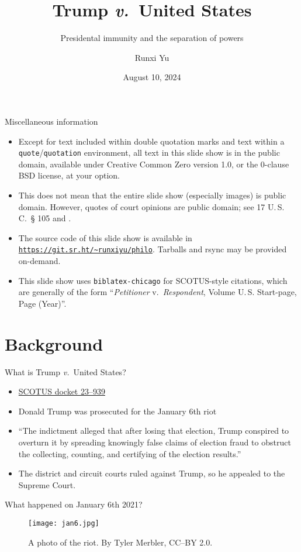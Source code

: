 \documentclass[ignorenonframetext, aspectratio=169]{beamer}
\title{Trump \textit{v.}\ United States}
\subtitle{Presidental immunity and the separation of powers}
\author{Runxi Yu}
\date{August 10, 2024}
\newcommand{\nopage}{\_\_\_\_}
\begin{document}
\begin{frame}
\titlepage
\end{frame}

\begin{frame}[fragile]{Miscellaneous information}
\begin{itemize}
	\item Except for text included within double quotation marks and text within a \verb|quote|/\verb|quotation| environment, all text in this slide show is in the public domain, available under Creative Common Zero version 1.0, or the 0-clause BSD license, at your option.
	\item This does not mean that the entire slide show (especially images) is public domain. However, quotes of court opinions are public domain; see 17 U.\,S.\,C.\ {\S} 105 and .
	\item The source code of this slide show is available in \href{https://git.sr.ht/~runxiyu/philo}{\texttt{https://git.sr.ht/\~{}runxiyu/philo}}. Tarballs and rsync may be provided on-demand.
	\item This slide show uses \texttt{biblatex-chicago} for SCOTUS-style citations, which are generally of the form ``\textit{Petitioner} v.\ \textit{Respondent}, Volume U.\,S. Start-page, Page (Year)''.
\end{itemize}
\end{frame}

\section{Background}

\begin{frame}{What is Trump \textit{v.}\ United States?}
\begin{itemize}
	\item \href{https://www.supremecourt.gov/docket/docketfiles/html/public/23-939.html}{SCOTUS docket 23--939}
	\item Donald Trump was prosecuted for the January 6th riot
	\item ``The indictment alleged that after losing that election, Trump conspired to overturn it by spreading knowingly false claims of election fraud to obstruct the collecting, counting, and certifying of the election results.'' \Runcite[\nopage{} (slip op., at 1)]{tvus}
	\item The district and circuit courts ruled against Trump, so he appealed to the Supreme Court.
\end{itemize}
\end{frame}

\begin{frame}{What happened on January 6th 2021?}
\begin{figure}
	\centering
	\texttt{[image: jan6.jpg]}
	\caption{A photo of the riot. By Tyler Merbler, CC--BY 2.0.}
\end{figure}
\end{frame}

\end{document}
